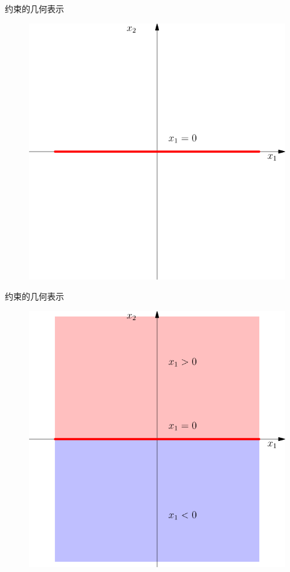 \documentclass[mathserif, table]{beamer}
\begin{document}
\begin{frame}{约束的几何表示}
  \begin{figure}[b]
    \centering
    \includegraphics[width=.6\textwidth{}]{equal.pdf}
  \end{figure}
\end{frame}

\begin{frame}{约束的几何表示}
  \begin{figure}[b]
    \centering
    \includegraphics[width=.6\textwidth{}]{halfplane.pdf}
  \end{figure}  
\end{frame}
\end{document}
